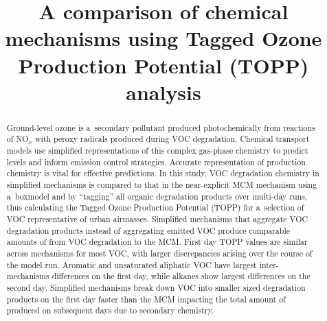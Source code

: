 \documentclass[acpd, online, hvmath]{copernicus}
\begin{document}
\hack{\sloppy}

\title{A comparison of chemical mechanisms using Tagged Ozone Production Potential (TOPP) analysis}










\published{}


\maketitle



\begin{abstract}
  Ground-level ozone is a~secondary pollutant produced photochemically
  from reactions of NO$_{x}$ with peroxy radicals produced during
  VOC degradation.  Chemical transport models use simplified
  representations of this complex gas-phase chemistry to predict
   levels and inform emission control strategies.  Accurate
  representation of  production chemistry is vital for
  effective predictions.  In this study, VOC degradation chemistry in
  simplified mechanisms is compared to that in the near-explicit MCM
  mechanism using a~boxmodel and by ``tagging'' all organic
  degradation products over multi-day runs, thus calculating the
  Tagged Ozone Production Potential (TOPP) for a~selection of VOC
  representative of urban airmasses.  Simplified mechanisms that
  aggregate VOC degradation products instead of aggregating emitted
  VOC produce comparable amounts of  from VOC degradation to
  the MCM.  First day TOPP values are similar across mechanisms for
  most VOC, with larger discrepancies arising over the course of the
  model run.  Aromatic and unsaturated aliphatic VOC have largest
  inter-mechanisms differences on the first day, while alkanes show
  largest differences on the second day.  Simplified mechanisms break
  down VOC into smaller sized degradation products on the first day
  faster than the MCM impacting the total amount of 
  produced on subsequent days due to secondary chemistry.
\end{abstract}
\end{document}

